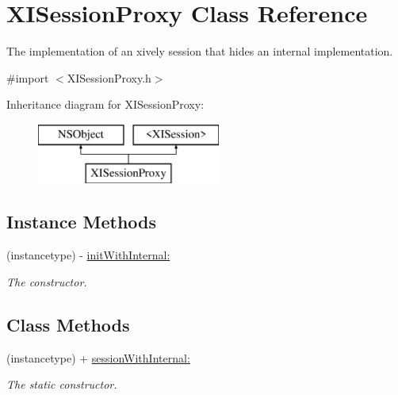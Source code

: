 \hypertarget{interface_x_i_session_proxy}{}\section{X\+I\+Session\+Proxy Class Reference}
\label{interface_x_i_session_proxy}


The implementation of an xively session that hides an internal implementation.  




{\ttfamily \#import $<$X\+I\+Session\+Proxy.\+h$>$}

Inheritance diagram for X\+I\+Session\+Proxy\+:\begin{figure}[H]
\begin{center}
\leavevmode
\includegraphics[height=2.000000cm]{interface_x_i_session_proxy}
\end{center}
\end{figure}
\subsection*{Instance Methods}
\begin{DoxyCompactItemize}
\item 
(instancetype) -\/ \hyperlink{interface_x_i_session_proxy_a16ae3a74b593a05e61585a8de35cbeb0}{init\+With\+Internal\+:}
\begin{DoxyCompactList}\small\item\em The constructor. \end{DoxyCompactList}\end{DoxyCompactItemize}
\subsection*{Class Methods}
\begin{DoxyCompactItemize}
\item 
(instancetype) + \hyperlink{interface_x_i_session_proxy_a10db38a5c03b5a880268bc87ee6df0c1}{session\+With\+Internal\+:}
\begin{DoxyCompactList}\small\item\em The static constructor. \end{DoxyCompactList}\end{DoxyCompactItemize}


